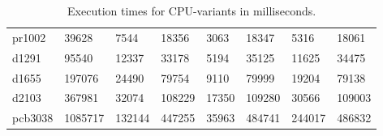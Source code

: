 \documentclass[english, 12pt, a4paper, sci, utf8, a-1b, online]{aaltothesis}
\begin{document}
\begin{table}[H]
\begin{tabular}{@{}llllllll@{}}
pr1002   & 39628                                                & 7544     & 18356    & 3063     & 18347    & 5316     & 18061    \\
d1291    & 95540                                                & 12337    & 33178    & 5194     & 35125    & 11625    & 34475    \\
d1655    & 197076                                               & 24490    & 79754    & 9110     & 79999    & 19204    & 79138    \\
d2103    & 367981                                               & 32074    & 108229   & 17350    & 109280   & 30566    & 109003   \\
pcb3038  & 1085717                                              & 132144   & 447255   & 35963    & 484741   & 244017   & 486832   \\ \bottomrule
\end{tabular}
\caption{Execution times for CPU-variants in milliseconds.} \label{fig:eff2}
\end{table}
\end{document}
